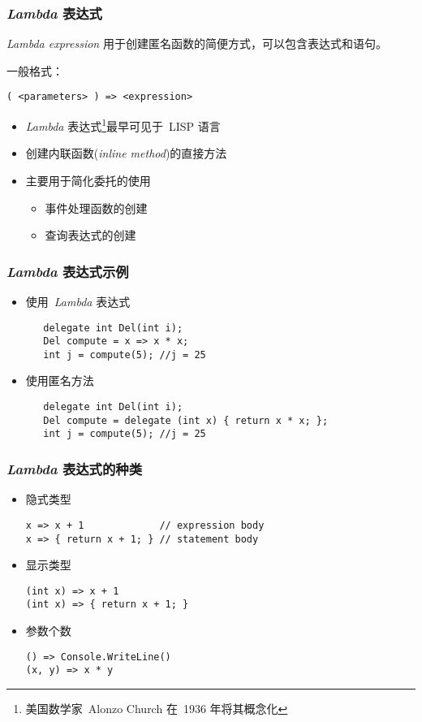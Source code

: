\begin{frame}[fragile]
\frametitle{\textit{Lambda} 表达式}
\begin{block}{\textit{Lambda expression}}
\CJKindent 用于创建匿名函数的简便方式，可以包含表达式和语句。
\end{block}
一般格式：
\begin{lstlisting}[escapeinside=<>]
   ( <parameters> ) => <expression>
\end{lstlisting}
\begin{itemize}
\item \textit{Lambda} 表达式\footnote{美国数学家~Alonzo Church 在~1936 年将其概念化}最早可见于~LISP 语言
\item 创建内联函数(\textit{inline method})的直接方法
\item 主要用于简化委托的使用
\begin{itemize}
\item 事件处理函数的创建
\item 查询表达式的创建
\end{itemize}
\end{itemize}
\end{frame}

\begin{frame}[fragile]
\frametitle{\textit{Lambda} 表达式示例}
\begin{itemize}
\item 使用~\textit{Lambda} 表达式
\begin{lstlisting}
   delegate int Del(int i);
   Del compute = x => x * x;
   int j = compute(5); //j = 25
\end{lstlisting}
\item 使用匿名方法
\begin{lstlisting}
   delegate int Del(int i);
   Del compute = delegate (int x) { return x * x; };
   int j = compute(5); //j = 25
\end{lstlisting}

\end{itemize}
\end{frame}

\begin{frame}[fragile]
\frametitle{\textit{Lambda} 表达式的种类}
\begin{itemize}
\item 隐式类型
\begin{lstlisting}
x => x + 1             // expression body
x => { return x + 1; } // statement body
\end{lstlisting}
\item 显示类型
\begin{lstlisting}
(int x) => x + 1
(int x) => { return x + 1; }
\end{lstlisting}
\item 参数个数
\begin{lstlisting}
() => Console.WriteLine()
(x, y) => x * y
\end{lstlisting}
\end{itemize}
\end{frame}


